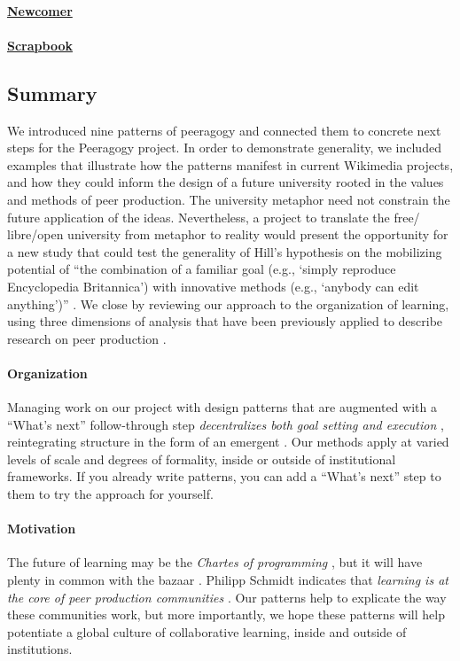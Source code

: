 \begin{refsection}
\paragraph{\hyperref[sec:Newcomer]{Newcomer}}
\NewcomerWN

\paragraph{\hyperref[sec:Scrapbook]{Scrapbook}} 
\ScrapbookWN

\subsection*{Summary}

We introduced nine patterns of peeragogy and connected them to
concrete next steps for the Peeragogy project.  In order to
demonstrate generality, we included examples that illustrate how the
patterns manifest in current Wikimedia projects, and how they could
inform the design of a future university rooted in the values and
methods of peer production.
%
The university metaphor need not constrain the future application of
the ideas.  Nevertheless, a project to translate the free\slash
libre\slash open university from metaphor to reality would present the
opportunity for a new study that could test the generality of Hill's
hypothesis on the mobilizing potential of ``the combination of a
familiar goal (e.g., `simply reproduce Encyclopedia Britannica') with
innovative methods (e.g., `anybody can edit anything')''
\cite[p.~13]{mako-thesis}.
We close by reviewing our approach to the organization of learning,
using three dimensions of analysis that have been previously applied to describe
research on peer production \cite{benkler2015peer}.

\paragraph{Organization} 
Managing work on our project with design patterns that are augmented
with a ``What's next'' follow-through step \emph{decentralizes both
  goal setting and execution} \cite{benkler2015peer}, reintegrating
structure in the form of an emergent .  Our
methods apply at varied levels of scale and degrees of formality,
inside or outside of institutional frameworks.  If you already write
patterns, you can add a ``What's next'' step to them to try the
approach for yourself.

\paragraph{Motivation}  The future of learning may be
the \emph{Chartes of programming} \cite{alexander1999origins}, but it will have plenty in common with the
bazaar \cite{raymond2001cathedral}.
%
Philipp Schmidt indicates that \emph{learning is at the core of peer
  production communities} \cite{schmidt+commons-based+2009}.  Our
patterns help to explicate the way these communities work, but more
importantly, we hope these patterns will help potentiate a global
culture of collaborative learning, inside and outside of institutions.


\end{refsection}
